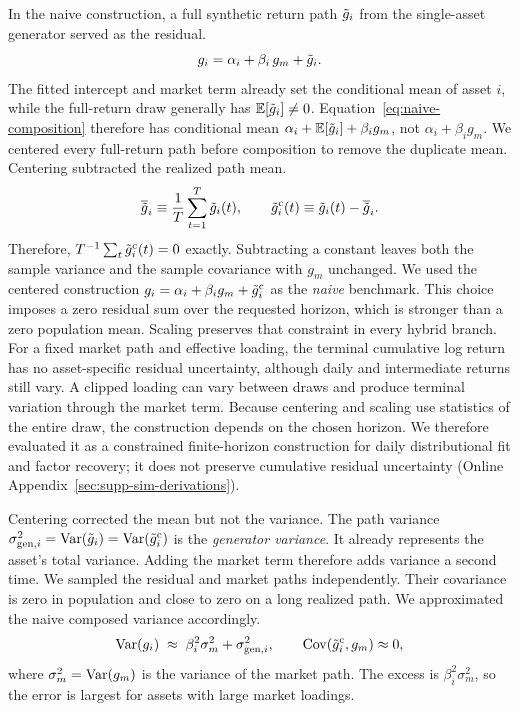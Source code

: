 In the naive construction, a full synthetic return path $\tilde{g}_i$ from
the single-asset generator served as the residual.
\begin{equation}\label{eq:naive-composition}
g_i = \alpha_i + \beta_i\, g_m + \tilde{g}_i.
\end{equation}
The fitted intercept and market term already set the conditional mean
of asset $i$, while the full-return draw generally has
$\mathbb{E}[\tilde{g}_i]\ne 0$. Equation~\eqref{eq:naive-composition} therefore has
conditional mean $\alpha_i+\mathbb{E}[\tilde{g}_i]+\beta_i g_m$, not
$\alpha_i+\beta_i g_m$.
We centered every full-return path before composition to remove the
duplicate mean. Centering subtracted the realized path mean.
\begin{equation}
  \overline{\tilde{g}}_i \equiv \frac{1}{T}\sum_{t=1}^{T}\tilde{g}_i(t),
  \qquad
  \tilde{g}_i^{\mathrm c}(t) \equiv \tilde{g}_i(t)-\overline{\tilde{g}}_i.
  \label{eq:center-generator}
\end{equation}
Therefore, $T^{-1}\sum_t\tilde{g}_i^{\mathrm c}(t)=0$ exactly. Subtracting a
constant leaves both the sample variance and the sample covariance with
$g_m$ unchanged. We used the centered construction
$g_i=\alpha_i+\beta_i g_m+\tilde{g}_i^{\mathrm c}$ as the \emph{naive}
benchmark. This choice imposes a zero residual sum over the requested
horizon, which is stronger than a zero population mean. Scaling
preserves that constraint in every hybrid branch. For a fixed market
path and effective loading, the terminal cumulative log return has no
asset-specific residual uncertainty, although daily and intermediate
returns still vary. A clipped loading can vary between draws and
produce terminal variation through the market term. Because centering
and scaling use statistics of the entire draw, the construction depends
on the chosen horizon. We therefore evaluated it as a constrained
finite-horizon construction for daily distributional fit and factor
recovery; it does not preserve cumulative residual uncertainty
(Online Appendix~\ref{sec:supp-sim-derivations}).

Centering corrected the mean but not the variance. The path variance
$\sigma_{\mathrm{gen},i}^2=\operatorname{Var}(\tilde{g}_i)=\operatorname{Var}(\tilde{g}_i^{\mathrm c})$ is the
\emph{generator variance}. It already represents the asset's total
variance. Adding the market term therefore adds variance a
second time. We sampled the residual and market paths independently.
Their covariance is zero in population and close to zero on a long
realized path. We approximated the naive composed variance accordingly.
\begin{equation}
  \operatorname{Var}(g_i)
  \;\approx\; \beta_i^2\sigma_m^2 + \sigma_{\mathrm{gen},i}^2,
  \qquad \operatorname{Cov}(\tilde{g}_i^{\mathrm c},g_m)\approx 0,
  \label{eq:naive-inflation}
\end{equation}
where $\sigma_m^2=\operatorname{Var}(g_m)$ is the variance of the market path. The
excess is $\beta_i^2\sigma_m^2$, so the error is largest for
assets with large market loadings.

